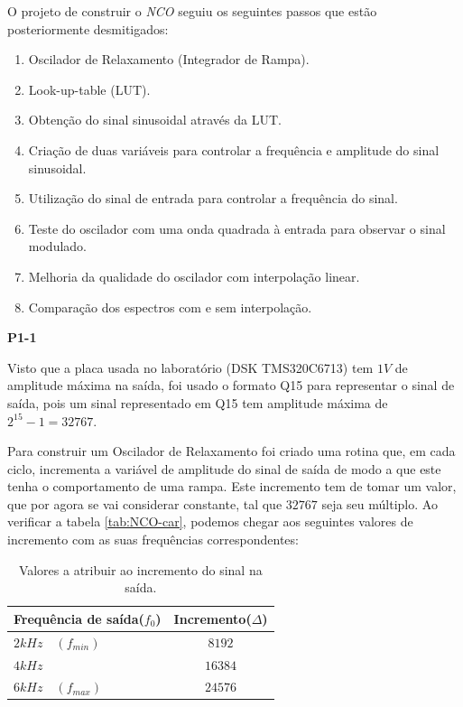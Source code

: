 \documentclass[11pt]{article}
\begin{document}
O projeto de construir o \textit{NCO} seguiu os seguintes passos que estão posteriormente desmitigados:

\begin{enumerate}
	\item Oscilador de Relaxamento (Integrador de Rampa). %
	\item Look-up-table (LUT). %
	\item Obtenção do sinal sinusoidal através da LUT.%
	\item Criação de duas variáveis para controlar a frequência e amplitude do sinal sinusoidal. %
	\item Utilização do sinal de entrada para controlar a frequência do sinal. %
	\item Teste do oscilador com uma onda quadrada à entrada para observar o sinal modulado.  %
	\item Melhoria da qualidade do oscilador com interpolação linear. %
	\item Comparação dos espectros com e sem interpolação.%
\end{enumerate}
\pagebreak

\textbf{P1-1}

 Visto que a placa usada no laboratório (DSK TMS320C6713) tem $1 V$ de amplitude máxima na saída, foi usado o formato Q15 para representar o sinal de saída, pois um sinal representado em Q15 tem amplitude máxima de $2^{15}-1 = 32767 $.

Para construir um Oscilador de Relaxamento foi criado uma rotina que, em cada ciclo, incrementa a variável de amplitude do sinal de saída de modo a que este tenha o comportamento de uma rampa. Este incremento tem de tomar um valor, que por agora se vai considerar constante, tal que $32767$ seja seu múltiplo. Ao verificar a tabela \ref{tab:NCO-car}, podemos chegar aos seguintes valores de incremento com as suas frequências correspondentes:


\begin{table}[H]
	\centering
	\caption{Valores a atribuir ao incremento do sinal na saída.}
	\label{tab:incrementos}
	\begin{tabular}[c]{|l||c|}
		\hline \textbf{Frequência de saída($f_0$)} & \textbf{Incremento($\Delta$)}\\ 
		\hline $ 2 kHz \quad (f_{min}) $ & $ 8192 $\\ 
		\hline $ 4 kHz $ & $ 16384 $  \\ 
		\hline $ 6 kHz \quad (f_{max}) $ & $ 24576 $ \\ 
		\hline
	\end{tabular}
\end{table}
\end{document}
